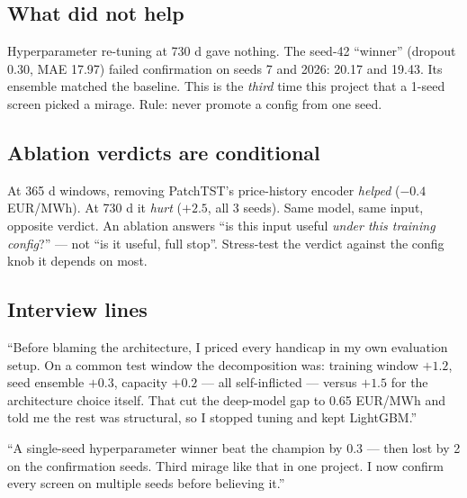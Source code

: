 \subsection{What did not help}

Hyperparameter re-tuning at 730 d gave nothing. The seed-42
``winner'' (dropout 0.30, MAE 17.97) failed confirmation on seeds
7 and 2026: 20.17 and 19.43. Its ensemble matched the baseline. This
is the \emph{third} time this project that a 1-seed screen picked a
mirage. Rule: never promote a config from one seed.

\subsection{Ablation verdicts are conditional}

At 365 d windows, removing PatchTST's price-history encoder
\emph{helped} ($-0.4$ EUR/MWh). At 730 d it \emph{hurt} ($+2.5$,
all 3 seeds). Same model, same input, opposite verdict. An ablation
answers ``is this input useful \emph{under this training config}?'' ---
not ``is it useful, full stop''. Stress-test the verdict against the
config knob it depends on most.

\subsection{Interview lines}

``Before blaming the architecture, I priced every handicap in my own
evaluation setup. On a common test window the decomposition was:
training window $+1.2$, seed ensemble $+0.3$, capacity $+0.2$ ---
all self-inflicted --- versus $+1.5$ for the architecture choice
itself. That cut the deep-model gap to 0.65 EUR/MWh and told me the
rest was structural, so I stopped tuning and kept LightGBM.''

``A single-seed hyperparameter winner beat the champion by 0.3 ---
then lost by 2 on the confirmation seeds. Third mirage like that in
one project. I now confirm every screen on multiple seeds before
believing it.''
